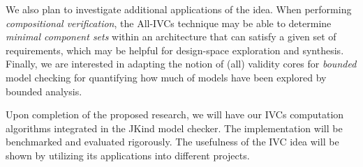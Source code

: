 We also plan to investigate additional applications of the idea.  When performing {\em compositional verification}, the All-IVCs technique may be able to determine {\em minimal component sets} within an architecture that can satisfy a given set of requirements, which may be helpful for design-space exploration and synthesis. Finally, we are interested in adapting the notion of (all) validity cores for \emph{bounded} model checking for quantifying how much of models have been explored by bounded analysis.

Upon completion of the proposed research, we will have our IVCs computation algorithms integrated in the JKind model checker. The implementation will be benchmarked and evaluated rigorously. The usefulness of the IVC idea will be shown by utilizing its applications into different projects.
